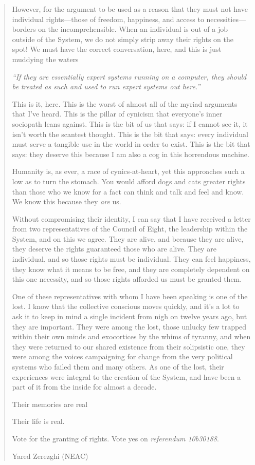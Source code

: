 \begin{quote}
However, for the argument to be used as a reason that they must not have individual rights---those of freedom, happiness, and access to necessities---borders on the incomprehensible. When an individual is out of a job outside of the System, we do not simply strip away their rights on the spot! We must have the correct conversation, here, and this is just muddying the waters

\emph{``If they are essentially expert systems running on a computer, they should be treated as such and used to run expert systems out here.''}

This is it, here. This is the worst of almost all of the myriad arguments that I've heard. This is the pillar of cynicism that everyone's inner sociopath leans against. This is the bit of us that says: if I cannot see it, it isn't worth the scantest thought. This is the bit that says: every individual must serve a tangible use in the world in order to exist. This is the bit that says: they deserve this because I am also a cog in this horrendous machine.

Humanity is, as ever, a race of cynics-at-heart, yet this approaches such a low as to turn the stomach. You would afford dogs and cats greater rights than those who we know for a fact can think and talk and feel and know. We know this because they \emph{are} us.

Without compromising their identity, I can say that I have received a letter from two representatives of the Council of Eight, the leadership within the System, and on this we agree. They are alive, and because they are alive, they deserve the rights guaranteed those who are alive. They are individual, and so those rights must be individual. They can feel happiness, they know what it means to be free, and they are completely dependent on this one necessity, and so those rights afforded us must be granted them.

One of these representatives with whom I have been speaking is one of the lost. I know that the collective conscious moves quickly, and it's a lot to ask it to keep in mind a single incident from nigh on twelve years ago, but they are important. They were among the lost, those unlucky few trapped within their own minds and exocortices by the whims of tyranny, and when they were returned to our shared existence from their solipsistic one, they were among the voices campaigning for change from the very political systems who failed them and many others. As one of the lost, their experiences were integral to the creation of the System, and have been a part of it from the inside for almost a decade.

Their memories are real

Their life is real.

Vote for the granting of rights. Vote yes on \emph{referendum 10b30188}.

Yared Zerezghi (NEAC)
\end{quote}

